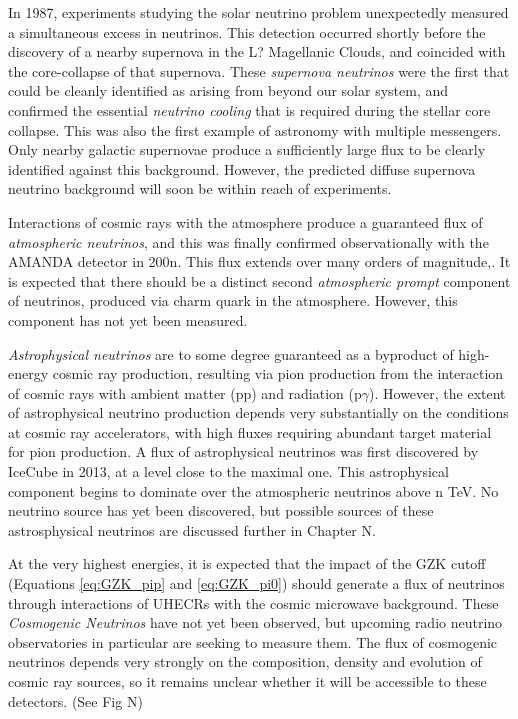 In 1987, experiments studying the solar neutrino problem unexpectedly measured a simultaneous excess in neutrinos. This detection occurred shortly before the discovery of a nearby supernova in the L? Magellanic Clouds, and coincided with the core-collapse of that supernova. These \emph{supernova neutrinos} were the first that could be cleanly identified as arising from beyond our solar system, and confirmed the essential \emph{neutrino cooling} that is required during the stellar core collapse. This was also the first example of astronomy with multiple messengers. Only nearby galactic supernovae produce a sufficiently large flux to be clearly identified against this background. However, the predicted diffuse supernova neutrino background will soon be within reach of experiments.

Interactions of cosmic rays with the atmosphere produce a guaranteed flux of \emph{atmospheric neutrinos}, and this was finally confirmed observationally with the AMANDA detector in 200n. This flux extends over many orders of magnitude,. It is expected that there should be a distinct second \emph{atmospheric prompt} component of neutrinos, produced via charm quark in the atmosphere. However, this component has not yet been measured.

\emph{Astrophysical neutrinos} are to some degree guaranteed as a byproduct of high-energy cosmic ray production, resulting via pion production from the interaction of cosmic rays with ambient matter (pp) and radiation (p$\gamma$). However, the extent of astrophysical neutrino production depends very substantially on the conditions at cosmic ray accelerators, with high fluxes requiring abundant target material for pion production. A flux of astrophysical neutrinos was first discovered by IceCube in 2013, at a level close to the maximal one. This astrophysical component begins to dominate over the atmospheric neutrinos above n TeV. No neutrino source has yet been discovered, but possible sources of these astrosphysical neutrinos are discussed further in Chapter N.

At the very highest energies, it is expected that the impact of the GZK cutoff (Equations \ref{eq:GZK_pip} and \ref{eq:GZK_pi0}) should generate a flux of neutrinos through interactions of UHECRs with the cosmic microwave background. These \emph{Cosmogenic Neutrinos} have not yet been observed, but upcoming radio neutrino observatories in particular are seeking to measure them. The flux of cosmogenic neutrinos depends very strongly on the composition, density and evolution of cosmic ray sources, so it remains unclear whether it will be accessible to these detectors. (See Fig N)

